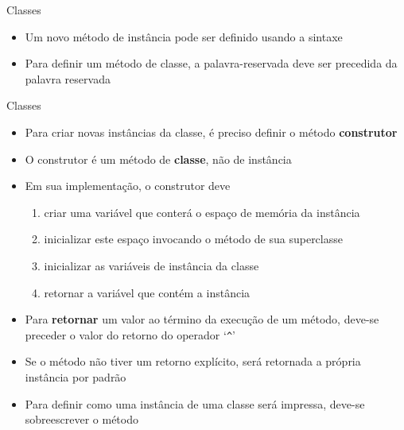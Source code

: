 \begin{frame}[fragile]{Classes}

    \begin{itemize}
        \item Um novo método de instância pode ser definido usando a  sintaxe


        \item Para definir um método de classe, a palavra-reservada  deve
            ser precedida da palavra reservada 

    \end{itemize}

\end{frame}
\begin{frame}[fragile]{Classes}

    \begin{itemize}
        \item Para criar novas instâncias da classe, é preciso definir o método \textbf{construtor}

        \item O construtor é um método de \textbf{classe}, não de instância

        \item Em sua implementação, o construtor deve
        \begin{enumerate}
            \item criar uma variável que conterá o espaço de memória da instância
            \item inicializar este espaço invocando o método  de sua
                superclasse
            \item inicializar as variáveis de instância da classe
            \item retornar a variável que contém a instância
        \end{enumerate}

        \item Para \textbf{retornar} um valor ao término da execução de um método, deve-se
            preceder o valor do retorno do operador `\texttt{\^}'

        \item Se o método não tiver um retorno explícito, será retornada a própria instância por
            padrão

        \item Para definir como uma instância de uma classe será impressa, deve-se sobreescrever
            o método 

    \end{itemize}

\end{frame}

